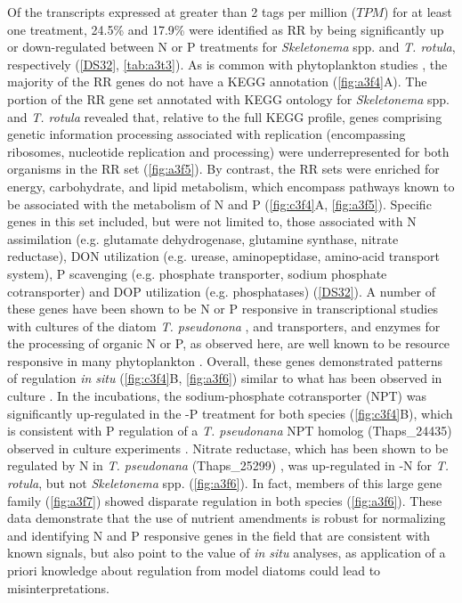 Of the transcripts expressed at greater than 2 tags per million ($TPM$) for at least one treatment, 24.5\% and 17.9\% were identified as RR by being significantly up or down-regulated between N or P treatments for \textit{Skeletonema} spp. and \textit{T. rotula}, respectively (\ref{DS32}, \cref{tab:a3t3}). As is common with phytoplankton studies \citep{Marchetti2012a}, the majority of the RR genes do not have a KEGG annotation (\cref{fig:a3f4}A). The portion of the RR gene set annotated with KEGG ontology for \textit{Skeletonema} spp. and \textit{T. rotula} revealed that, relative to the full KEGG profile, genes comprising genetic information processing associated with replication (encompassing ribosomes, nucleotide replication and processing) were underrepresented for both organisms in the RR set (\cref{fig:a3f5}). By contrast, the RR sets were enriched for energy, carbohydrate, and lipid metabolism, which encompass pathways known to be associated with the metabolism of N and P (\cref{fig:c3f4}A, \cref{fig:a3f5}). Specific genes in this set included, but were not limited to, those associated with N assimilation (e.g. glutamate dehydrogenase, glutamine synthase, nitrate reductase), DON utilization (e.g. urease, aminopeptidase, amino-acid transport system), P scavenging (e.g. phosphate transporter, sodium phosphate cotransporter) and DOP utilization (e.g. phosphatases) (\ref{DS32}). A number of these genes have been shown to be N or P responsive in transcriptional studies with cultures of the diatom \textit{T. pseudonona} \citep{Dyhrman2012, Bender2014}, and transporters, and enzymes for the processing of organic N or P, as observed here, are well known to be resource responsive in many phytoplankton \citep{Dyhrman2012, Wurch2011, Dyhrman2006, Bruhn2010}. Overall, these genes demonstrated patterns of regulation \textit{in situ} (\cref{fig:c3f4}B, \cref{fig:a3f6}) similar to what has been observed in culture \citep{Dyhrman2012, Bender2014}. In the incubations, the sodium-phosphate cotransporter (NPT) was significantly up-regulated in the -P treatment for both species (\cref{fig:c3f4}B), which is consistent with P regulation of a \textit{T. pseudonana} NPT homolog (Thaps\_24435) observed in culture experiments \citep{Dyhrman2012}. Nitrate reductase, which has been shown to be regulated by N in \textit{T. pseudonana} (Thaps\_25299) \citep{Bender2012}, was up-regulated in -N for \textit{T. rotula}, but not \textit{Skeletonema} spp. (\cref{fig:a3f6}). In fact, members of this large gene family (\cref{fig:a3f7}) showed disparate regulation in both species (\cref{fig:a3f6}).  These data demonstrate that the use of nutrient amendments is robust for normalizing and identifying N and P responsive genes in the field that are consistent with known signals, but also point to the value of \textit{in situ} analyses, as application of a priori knowledge about regulation from model diatoms could lead to misinterpretations.\par

